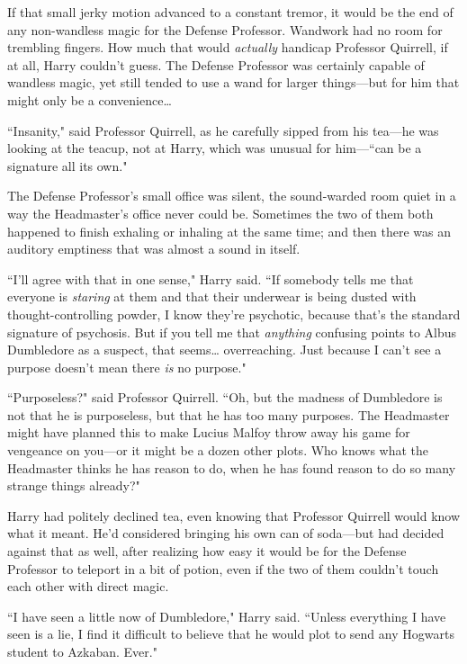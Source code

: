 If that small jerky motion advanced to a constant tremor, it would be the end of any non-wandless magic for the Defense Professor. Wandwork had no room for trembling fingers. How much that would \emph{actually} handicap Professor Quirrell, if at all, Harry couldn't guess. The Defense Professor was certainly capable of wandless magic, yet still tended to use a wand for larger things—but for him that might only be a convenience{\ldots}

``Insanity," said Professor Quirrell, as he carefully sipped from his tea—he was looking at the teacup, not at Harry, which was unusual for him—``can be a signature all its own."

The Defense Professor's small office was silent, the sound-warded room quiet in a way the Headmaster's office never could be. Sometimes the two of them both happened to finish exhaling or inhaling at the same time; and then there was an auditory emptiness that was almost a sound in itself.

``I'll agree with that in one sense," Harry said. ``If somebody tells me that everyone is \emph{staring} at them and that their underwear is being dusted with thought-controlling powder, I know they're psychotic, because that's the standard signature of psychosis. But if you tell me that \emph{anything} confusing points to Albus Dumbledore as a suspect, that seems{\ldots} overreaching. Just because I can't see a purpose doesn't mean there \emph{is} no purpose."

``Purposeless?" said Professor Quirrell. ``Oh, but the madness of Dumbledore is not that he is purposeless, but that he has too many purposes. The Headmaster might have planned this to make Lucius Malfoy throw away his game for vengeance on you—or it might be a dozen other plots. Who knows what the Headmaster thinks he has reason to do, when he has found reason to do so many strange things already?"

Harry had politely declined tea, even knowing that Professor Quirrell would know what it meant. He'd considered bringing his own can of soda—but had decided against that as well, after realizing how easy it would be for the Defense Professor to teleport in a bit of potion, even if the two of them couldn't touch each other with direct magic.

``I have seen a little now of Dumbledore," Harry said. ``Unless everything I have seen is a lie, I find it difficult to believe that he would plot to send any Hogwarts student to Azkaban. Ever."


